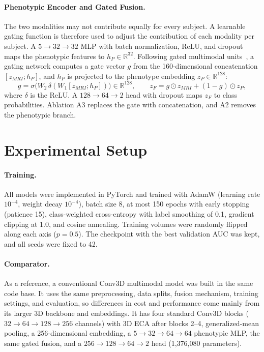 \documentclass[runningheads]{llncs}
\begin{document}
\paragraph{Phenotypic Encoder and Gated Fusion.}
The two modalities may not contribute equally for every subject. A learnable gating function is therefore used to adjust the contribution of each modality per subject. A $5\rightarrow32\rightarrow32$ MLP with batch normalization, ReLU, and dropout maps the phenotypic features to $h_P\in\mathbb{R}^{32}$. Following gated multimodal units~\cite{arevalo2017gmu}, a gating network computes a gate vector $g$ from the 160-dimensional concatenation $[z_{MRI};h_P]$, and $h_P$ is projected to the phenotype embedding $z_P\in\mathbb{R}^{128}$:
\begin{equation}
g=\sigma\big(W_2\,\delta(W_1[z_{MRI};h_P])\big)\in\mathbb{R}^{128}, \qquad z_F = g \odot z_{MRI} + (1-g) \odot z_P,
\end{equation}
where $\delta$ is the ReLU. A $128\rightarrow64\rightarrow2$ head with dropout maps $z_F$ to class probabilities. Ablation A3 replaces the gate with concatenation, and A2 removes the phenotypic branch.

\section{Experimental Setup}

\paragraph{Training.}
All models were implemented in PyTorch and trained with AdamW (learning rate $10^{-4}$, weight decay $10^{-4}$), batch size 8, at most 150 epochs with early stopping (patience 15), class-weighted cross-entropy with label smoothing of 0.1, gradient clipping at 1.0, and cosine annealing. Training volumes were randomly flipped along each axis ($p=0.5$). The checkpoint with the best validation AUC was kept, and all seeds were fixed to 42.

\paragraph{Comparator.}
As a reference, a conventional Conv3D multimodal model was built in the same code base. It uses the same preprocessing, data splits, fusion mechanism, training settings, and evaluation, so differences in cost and performance come mainly from its larger 3D backbone and embeddings. It has four standard Conv3D blocks ($32\rightarrow64\rightarrow128\rightarrow256$ channels) with 3D ECA after blocks 2--4, generalized-mean pooling, a 256-dimensional embedding, a $5\rightarrow32\rightarrow64\rightarrow64$ phenotypic MLP, the same gated fusion, and a $256\rightarrow128\rightarrow64\rightarrow2$ head (1,376,080 parameters).
\end{document}
